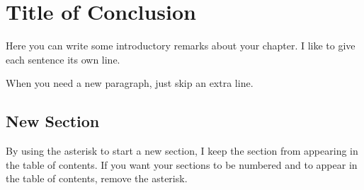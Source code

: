 

\chapter[Table of Contents Title][Top of Page Title]{Title of Conclusion}

Here you can write some introductory remarks about your chapter.
I like to give each sentence its own line.

When you need a new paragraph, just skip an extra line.

\section*{New Section}

By using the asterisk to start a new section, I keep the section from appearing in the table of contents.
If you want your sections to be numbered and to appear in the table of contents, remove the asterisk.

